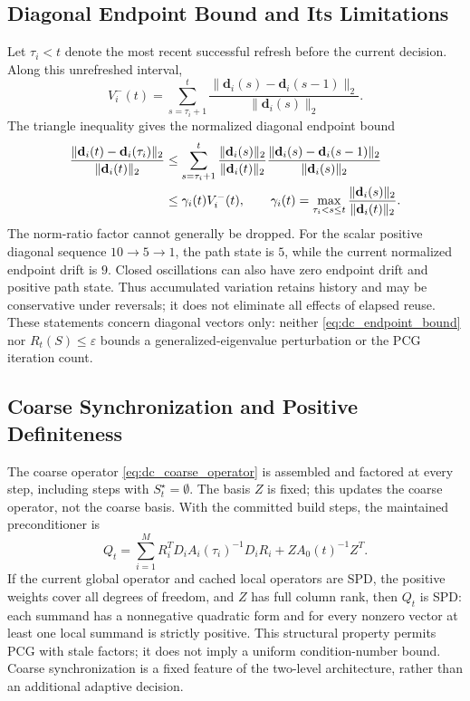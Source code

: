 \documentclass[preprint,12pt,3p]{elsarticle}
\begin{document}
\subsection{Diagonal Endpoint Bound and Its Limitations}
Let $\tau_i<t$ denote the most recent successful refresh before the current
decision. Along this unrefreshed interval,
\begin{equation}
V_i^-(t)=\sum_{s=\tau_i+1}^{t}
\frac{\|\mathbf d_i(s)-\mathbf d_i(s-1)\|_2}{\|\mathbf d_i(s)\|_2}.
\label{eq:dc_path_sum}
\end{equation}
The triangle inequality gives the normalized diagonal endpoint bound
\begin{align}
\frac{\|\mathbf d_i(t)-\mathbf d_i(\tau_i)\|_2}{\|\mathbf d_i(t)\|_2}
&\le\sum_{s=\tau_i+1}^{t}
\frac{\|\mathbf d_i(s)\|_2}{\|\mathbf d_i(t)\|_2}
\frac{\|\mathbf d_i(s)-\mathbf d_i(s-1)\|_2}{\|\mathbf d_i(s)\|_2}
\notag\\
&\le\gamma_i(t)V_i^-(t),\qquad
\gamma_i(t)=\max_{\tau_i<s\le t}
\frac{\|\mathbf d_i(s)\|_2}{\|\mathbf d_i(t)\|_2}.
\label{eq:dc_endpoint_bound}
\end{align}
The norm-ratio factor cannot generally be dropped. For the scalar positive
diagonal sequence $10\to5\to1$, the path state is $5$, while the current
normalized endpoint drift is $9$. Closed oscillations can also have zero
endpoint drift and positive path state. Thus accumulated variation retains
history and may be conservative under reversals; it does not eliminate all
effects of elapsed reuse. These statements concern diagonal vectors only:
neither \eqref{eq:dc_endpoint_bound} nor $R_t(S)\le\varepsilon$ bounds a
generalized-eigenvalue perturbation or the PCG iteration count.

\subsection{Coarse Synchronization and Positive Definiteness}
The coarse operator \eqref{eq:dc_coarse_operator} is assembled and factored at
every step, including steps with $S_t^\star=\emptyset$. The basis $Z$ is fixed;
this updates the coarse operator, not the coarse basis. With the committed
build steps, the maintained preconditioner is
\begin{equation}
Q_t=\sum_{i=1}^M R_i^T D_i A_i(\tau_i)^{-1}D_i R_i
       +Z A_0(t)^{-1}Z^T.
\label{eq:dc_maintained_preconditioner}
\end{equation}
If the current global operator and cached local operators are SPD, the positive
weights cover all degrees of freedom, and $Z$ has full column rank, then $Q_t$
is SPD: each summand has a nonnegative quadratic form and for every nonzero
vector at least one local summand is strictly positive. This structural
property permits PCG with stale factors; it does not imply a uniform
condition-number bound. Coarse synchronization is a fixed feature of the
two-level architecture, rather than an additional adaptive decision.
\end{document}
